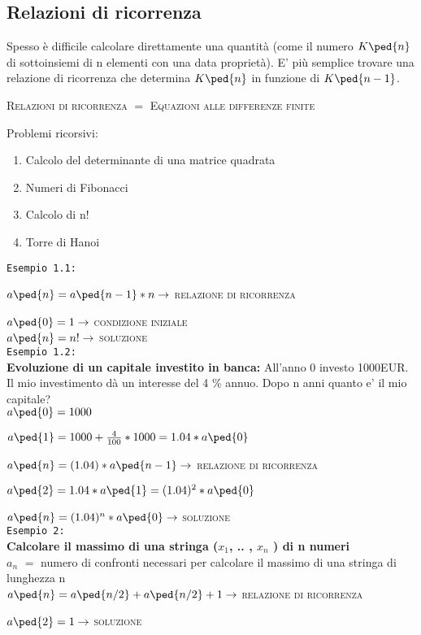 \subsection{Relazioni di ricorrenza}
Spesso è difficile calcolare direttamente una quantità (come il numero \( K\ped{n}\)
di sottoinsiemi di n
elementi con una data proprietà). E' più semplice trovare una relazione di ricorrenza che
determina \( K\ped{n} \) in funzione di \( K\ped{n-1} \). \\
\begin{center}
\textsc{Relazioni di ricorrenza $=$ Equazioni alle differenze finite}
\end{center}

Problemi ricorsivi:
\begin{enumerate}
\item Calcolo del determinante di una matrice quadrata
\item Numeri di Fibonacci
\item Calcolo di n!
\item Torre di Hanoi
\end{enumerate} 

\texttt{Esempio 1.1:} \par
    \(a\ped{n} = a\ped{n-1} * n \rightarrow \) \textsc{relazione di ricorrenza} \par
    \(a\ped{0} = 1 \rightarrow \) \textsc{condizione iniziale} \\

    \( a\ped{n} = n! \rightarrow \) \textsc{soluzione} \\

\texttt{Esempio 1.2:} \\
\textbf{Evoluzione di un capitale investito in banca:}  All'anno 0 investo 1000EUR. Il mio investimento dà un interesse del 4 \% annuo. Dopo n anni quanto e' il mio capitale? \\

\(a\ped{0} = 1000 \) \par
\(a\ped{1} = 1000 + \frac{4}{100} * 1000 = 1.04 * a\ped{0} \) \par
\(a\ped{n} = (1.04) * a\ped{n-1} \rightarrow \) \textsc{relazione di ricorrenza} \par

\(a\ped{2} = 1.04 * a\ped{1} = (1.04)^2 * a\ped{0} \) \par

\(a\ped{n} = (1.04)^n * a\ped{0} \rightarrow \) \textsc{soluzione} 
\\

\texttt{Esempio 2:} \\
\textbf{Calcolare il massimo di una stringa ($x_1$, .. , $x_n$ ) di n numeri} \\
$a_n$ $=$ numero di confronti necessari per calcolare il massimo di una stringa di lunghezza n \\

\( a\ped{n} = a\ped{n/2} + a\ped{n/2} +1 \rightarrow \) \textsc{relazione di ricorrenza} \par

\( a\ped{2} = 1 \rightarrow \) \textsc{soluzione} 

\newpage
